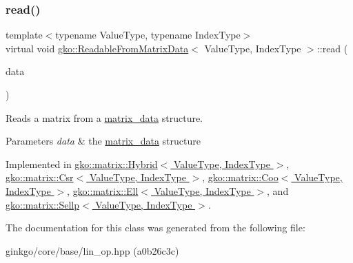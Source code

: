 \subsubsection{\texorpdfstring{read()}{read()}}
{\footnotesize\ttfamily template$<$typename Value\+Type, typename Index\+Type$>$ \\
virtual void \hyperlink{classgko_1_1ReadableFromMatrixData}{gko\+::\+Readable\+From\+Matrix\+Data}$<$ Value\+Type, Index\+Type $>$\+::read (\begin{DoxyParamCaption}\item[{const \hyperlink{structgko_1_1matrix__data}{matrix\+\_\+data}$<$ Value\+Type, Index\+Type $>$ \&}]{data }\end{DoxyParamCaption})\hspace{0.3cm}{\ttfamily [pure virtual]}}



Reads a matrix from a \hyperlink{structgko_1_1matrix__data}{matrix\+\_\+data} structure. 


\begin{DoxyParams}{Parameters}
{\em data} & the \hyperlink{structgko_1_1matrix__data}{matrix\+\_\+data} structure \\
\hline
\end{DoxyParams}


Implemented in \hyperlink{classgko_1_1matrix_1_1Hybrid_a7eff2922ae21e9722b343ca1832d8bf5}{gko\+::matrix\+::\+Hybrid$<$ Value\+Type, Index\+Type $>$}, \hyperlink{classgko_1_1matrix_1_1Csr_ac4db41146ed3c3a8653b03d6b2c6c675}{gko\+::matrix\+::\+Csr$<$ Value\+Type, Index\+Type $>$}, \hyperlink{classgko_1_1matrix_1_1Coo_ac0d4aeb19d9f55b62bea18bad1a408f5}{gko\+::matrix\+::\+Coo$<$ Value\+Type, Index\+Type $>$}, \hyperlink{classgko_1_1matrix_1_1Ell_a2c877d9f7bbc57f97df5ab443954a6fd}{gko\+::matrix\+::\+Ell$<$ Value\+Type, Index\+Type $>$}, and \hyperlink{classgko_1_1matrix_1_1Sellp_a2c5ff4a3f190daf7d70bbd8451d13edd}{gko\+::matrix\+::\+Sellp$<$ Value\+Type, Index\+Type $>$}.



The documentation for this class was generated from the following file\+:\begin{DoxyCompactItemize}
\item 
ginkgo/core/base/lin\+\_\+op.\+hpp (a0b26c3c)\end{DoxyCompactItemize}
